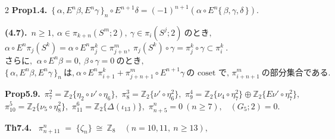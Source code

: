 \documentclass[10pt, leqno]{ltjsarticle}
\newcommand{\toda}[1]{\{\,#1\,\}}              %
\newcommand{\todai}[2][]{\{\,#2\,\}_{#1}}      %
\newcommand{\gen}[1]{\{#1\}}       %
\newcommand{\pis}[2]{\pi_{#1}(#2)}       %
\newcommand{\pit}[2]{\pi_{#1}^{#2}}
\numberwithin{equation}{section}
\theoremstyle{plain}
\theoremstyle{definition}
\theoremstyle{remark}
\begin{document}
\begin{paracol}{2}
\noindent
\textbf{Prop1.4.}\
\(\todai[n]{\alpha, E^n\beta, E^n\gamma}\circ E^{n+1}\delta
= (-1)^{n+1}(\alpha\circ E^n\toda{\beta, \gamma, \delta})\).

\noindent
\textbf{(4.7).}\
\(n\ge1, \ \alpha\in\pis{k+n}{S^m; 2},\ \gamma\in\pis{i}{S^j; 2}
\ \text{のとき, }\)\\
\(\alpha\circ E^n\pis{j}{S^k} = \alpha\circ E^n \pit{j}{k}
\subset \pit{j+n}{m},
\ \pis{j}{S^k}\circ\gamma = \pit{j}{k}\circ\gamma \subset\pit{i}{k}\ . \)\\
\(\text{さらに, }\ \alpha\circ E^n\beta=0,\ \beta\circ\gamma = 0 \ \text{のとき, }\)\\
\(\todai[n]{\alpha, E^n\beta, E^n\gamma}\ \text{は,}\
\alpha\circ E^n\pit{i+1}{k} + \pit{j+n+1}{m}\circ E^{n+1}\gamma\
\text{の coset で, }\pit{i+n+1}{m} \ \text{の部分集合である. }\)

\noindent
\textbf{Prop5.9.}\
\(\pi^{2}_{7}=\mathbb Z_2\gen{\eta_{2}\circ\nu'\circ\eta_6},\) \quad
\(\pi^{3}_{8}=\mathbb Z_2\gen{\nu'\circ\eta_6^2},\) \quad
\(\pi^{4}_{9}=\mathbb Z_2\gen{\nu_{4}\circ\eta_7^2}\oplus \mathbb Z_2\gen{E\nu'\circ\eta_7^2},\) \\
\(\pi^{5}_{10}=\mathbb Z_2\gen{\nu_{5}\circ\eta_8^2},\) \quad
\(\pi^{6}_{11}=\mathbb Z_2\gen{\Delta(\iota_{13})},\) \quad
\(\pi^{n}_{n+5}=0\ (n\ge7),\) \
\((G_{5};2)=0.\)

\noindent
\textbf{Th7.4.}\
\(\pit{n+11}{n} \;=\; \gen{\zeta_{n}}\ \cong\ \mathbb Z_{8}\quad (n=10,11, \ n\ge13),\)







\end{paracol}
\end{document}

